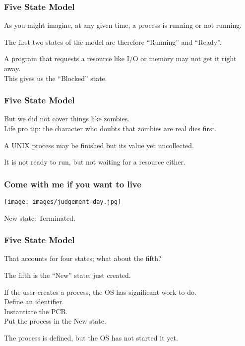 \begin{frame}
	\frametitle{Five State Model}

	As you might imagine, at any given time, a process is running or not running.

	The first two states of the model are therefore ``Running'' and ``Ready''.

	A program that requests a resource like I/O or memory may not get it right away.\\
	\quad This gives us the ``Blocked'' state.

\end{frame}


\begin{frame}
	\frametitle{Five State Model}

	But we did not cover things like zombies.\\
	\quad Life pro tip: the character who doubts that zombies are real dies first.

	A UNIX process may be finished but its value yet uncollected.

	It is not ready to run, but not waiting for a resource either.

\end{frame}


\begin{frame}
	\frametitle{Come with me if you want to live}

	\begin{center}
		\texttt{[image: images/judgement-day.jpg]}
	\end{center}

	New state: Terminated.

\end{frame}


\begin{frame}
	\frametitle{Five State Model}
	That accounts for four states; what about the fifth?

	The fifth is the ``New'' state: just created.

	If the user creates a process, the OS has significant work to do.\\
	\quad Define an identifier.\\
	\quad Instantiate the PCB.\\
	\quad Put the process in the New state.

	The process is defined, but the OS has not started it yet.

\end{frame}

